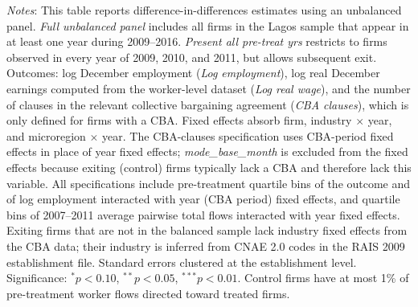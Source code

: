\begin{table}[H]
\begin{minipage}{\textwidth}
\textit{Notes}: This table reports difference-in-differences estimates using an unbalanced panel. \textit{Full unbalanced panel} includes all firms in the Lagos sample that appear in at least one year during 2009--2016. \textit{Present all pre-treat yrs} restricts to firms observed in every year of 2009, 2010, and 2011, but allows subsequent exit. Outcomes: log December employment (\textit{Log employment}), log real December earnings computed from the worker-level dataset (\textit{Log real wage}), and the number of clauses in the relevant collective bargaining agreement (\textit{CBA clauses}), which is only defined for firms with a CBA. Fixed effects absorb firm, industry $\times$ year, and microregion $\times$ year. The CBA-clauses specification uses CBA-period fixed effects in place of year fixed effects; \textit{mode\_base\_month} is excluded from the fixed effects because exiting (control) firms typically lack a CBA and therefore lack this variable. All specifications include pre-treatment quartile bins of the outcome and of log employment interacted with year (CBA period) fixed effects, and quartile bins of 2007--2011 average pairwise total flows interacted with year fixed effects. Exiting firms that are not in the balanced sample lack industry fixed effects from the CBA data; their industry is inferred from CNAE 2.0 codes in the RAIS 2009 establishment file. Standard errors clustered at the establishment level. Significance: $^{*}p{<}0.10$, $^{**}p{<}0.05$, $^{***}p{<}0.01$. Control firms have at most 1\% of pre-treatment worker flows directed toward treated firms.
\end{minipage}
\end{table}
